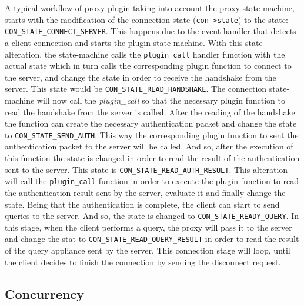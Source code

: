 A typical workflow of proxy plugin taking into account the proxy state machine, starts with the modification of the connection state (\texttt{con->state}) to the state: \texttt{CON\_STATE\_CON\-NECT\_SERVER}. This happens due to the event handler that detects a client connection and starts the plugin state-machine. With this state alteration, the state-machine calls the \texttt{plugin\_call} handler function with the actual state which in turn calls the corresponding plugin function to connect to the server, and change the state in order to receive the handshake from the server. This state would be \texttt{CON\_STATE\_READ\_HANDSHAKE}. The connection state-machine will now call the \textit{plugin\_call} so that the necessary plugin function to read the handshake from the server is called. After the reading of the handshake the function can create the necessary authentication packet and change the state to \texttt{CON\_STATE\_SEND\_AUTH}. This way the corresponding plugin function to sent the authentication packet to the server will be called. And so, after the execution of this function the state is changed in order to read the result of the authentication sent to the server. This state is \texttt{CON\_STATE\_READ\_AUTH\_RESULT}. This alteration will call the \texttt{plugin\_call} function in order to execute the plugin function to read the authentication result sent by the server, evaluate it and finally change the state. Being that the authentication is complete, the client can start to send queries to the server. And so, the state is changed to \texttt{CON\_STATE\_READY\_QUERY}. In this stage, when the client performs a query, the proxy will pass it to the server and change the stat to \texttt{CON\_STATE\_READ\_QUERY\_RESULT} in order to read the result of the query appliance sent by the server. This connection stage will loop, until the client decides to finish the connection by sending the disconnect request.




\subsection{Concurrency}

